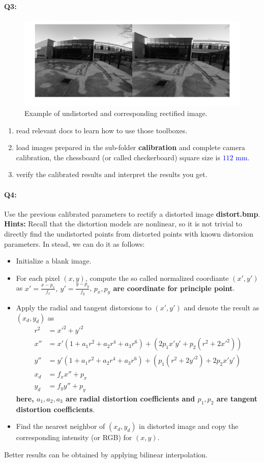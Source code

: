 \documentclass[a4paper]{article}
\begin{document}
\paragraph{Q3:} 
\begin{figure}[!b]
\centering
\includegraphics[scale=0.2]{figures/rec.png}
\caption{Example of undistorted and corresponding rectified image.}
\end{figure}
\begin{enumerate}
\item read relevant docs to learn how to use those toolboxes.
\item load images prepared in the sub-folder \textbf{calibration} and complete camera calibration, the chessboard (or called checkerboard) square size is \textcolor{blue}{$112$ mm}.
\item verify the calibrated results and interpret the results you get.
\end{enumerate}
\paragraph{Q4:} 
Use the previous calibrated parameters to rectify a distorted image \textbf{distort.bmp}. 
\textbf{Hints:}
Recall that the distortion models are nonlinear, so it is not trivial to directly find the undistorted points from distorted points with known distorsion parameters. In stead, we can do it as follows:
\begin{itemize}
	\item Initialize a blank image.
	\item For each pixel $(x,y)$, compute the so called normalized coordiante $(x',y')$ as $x'=\frac{x-p_x}{f_x},\ y'=\frac{y-p_y}{f_y}$, \textbf{$p_x,p_y$ are coordinate for principle point}.
	\item Apply the radial and tangent distorsions to $(x',y')$ and denote the result as $(x_d,y_d)$ as
	\begin{align*}
		r^2 &= x'^2+y'^2 \\
		x'' &= x'(1+a_1r^2+a_2r^4+a_3r^6)+(2p_1x'y'+p_2(r^2+2x'^2)) \\
		y'' &= y'(1+a_1r^2+a_2r^4+a_3r^6)+(p_1(r^2+2y'^2)+2p_2x'y') \\
		x_d &= f_xx''+p_x\\
		y_d &=f_yy''+p_y
	\end{align*}
	\textbf{here, $a_1,a_2,a_3$ are radial distortion coefficients and $p_1,p_2$ are tangent distortion coefficients}. 
	\item Find the nearest neighbor of $(x_d,y_d)$ in distorted image and copy the corresponding intensity (or RGB) for $(x,y)$. 
\end{itemize}
Better results can be obtained by applying bilinear interpolation.
\end{document}
